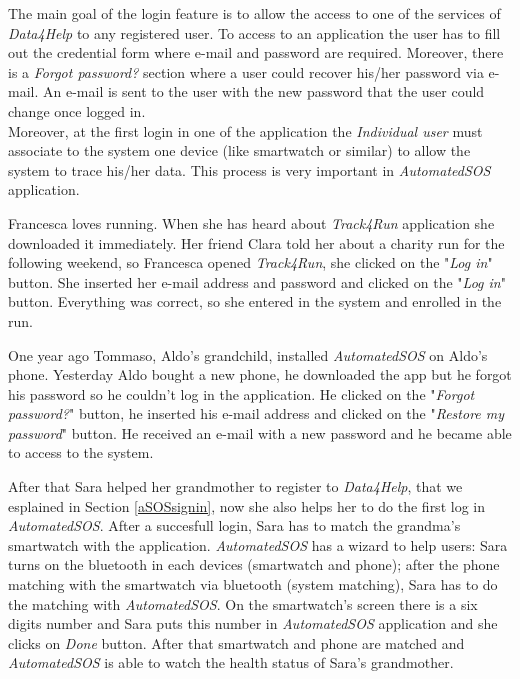 The main goal of the login feature is to allow the access to one of the services of \textit{Data4Help} to any registered user. To access to an application the user has to fill out the credential form where e-mail and password are required. Moreover, there is a \textit{Forgot password?} section where a user could recover his/her password via e-mail. An e-mail is sent to the user with the new password that the user could change once logged in.\\
Moreover, at the first login in one of the application the \textit{Individual user} must associate to the system one device (like smartwatch or similar) to allow the system to trace his/her data. This process is very important in \textit{AutomatedSOS} application.

Francesca loves running. When she has heard about \textit{Track4Run} application she downloaded it immediately. Her friend Clara told her about a charity run for the following weekend, so Francesca opened \textit{Track4Run}, she clicked on the "\textit{Log in}" button. She inserted her e-mail address and password and clicked on the "\textit{Log in}" button. Everything was correct, so she entered in the system and enrolled in the run.

One year ago Tommaso, Aldo's grandchild, installed \textit{AutomatedSOS} on Aldo’s phone. Yesterday Aldo bought a new phone, he downloaded the app but he forgot his password so he couldn’t log in the application. He clicked on the "\textit{Forgot password?}" button, he inserted his e-mail address and clicked on the  "\textit{Restore my password}" button. He received an e-mail with a new password and he became able to access to the system.

After that Sara helped her grandmother to register to \textit{Data4Help}, that we esplained in Section \ref{aSOSsignin}, now she also helps her to do the first log in \textit{AutomatedSOS}. After a succesfull login, Sara has to match the grandma's smartwatch with the application. \textit{AutomatedSOS} has a wizard to help users: Sara turns on the bluetooth in each devices (smartwatch and phone); after the phone matching with the smartwatch via bluetooth (system matching), Sara has to do the matching with \textit{AutomatedSOS}. On the smartwatch's screen there is a six digits number and Sara puts this number in \textit{AutomatedSOS} application and she clicks on \textit{Done} button. After that smartwatch and phone are matched and \textit{AutomatedSOS} is able to watch the health status of Sara's grandmother.

